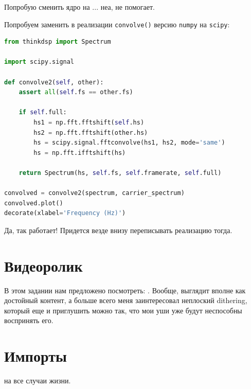 \documentclass[a4paper,12pt]{report}
\begin{document}
    Попробую сменить ядро  на ... неа, не помогает. 
    
    Попробуем заменить в реализации \texttt{convolve()} версию \texttt{numpy} на \texttt{scipy}:
    
\begin{lstlisting}[language=Python,caption=Замена]
from thinkdsp import Spectrum

import scipy.signal

def convolve2(self, other):
    assert all(self.fs == other.fs)
    
    if self.full:
        hs1 = np.fft.fftshift(self.hs)
        hs2 = np.fft.fftshift(other.hs)
        hs = scipy.signal.fftconvolve(hs1, hs2, mode='same')
        hs = np.fft.ifftshift(hs)

    return Spectrum(hs, self.fs, self.framerate, self.full)

convolved = convolve2(spectrum, carrier_spectrum)
convolved.plot()
decorate(xlabel='Frequency (Hz)')
\end{lstlisting}

    Да, так работает! Придется везде внизу переписывать реализацию тогда.
    
    \chapter{Видеоролик}
    
    В этом задании нам предложено посмотреть: . Вообще, выглядит вполне как достойный контент, а больше всего меня заинтересовал неплоский dithering, который еще и приглушить можно так, что мои уши уже будут неспособны воспринять его.
    
    \chapter{Импорты}
    
     на все случаи жизни.
    
\end{document}
